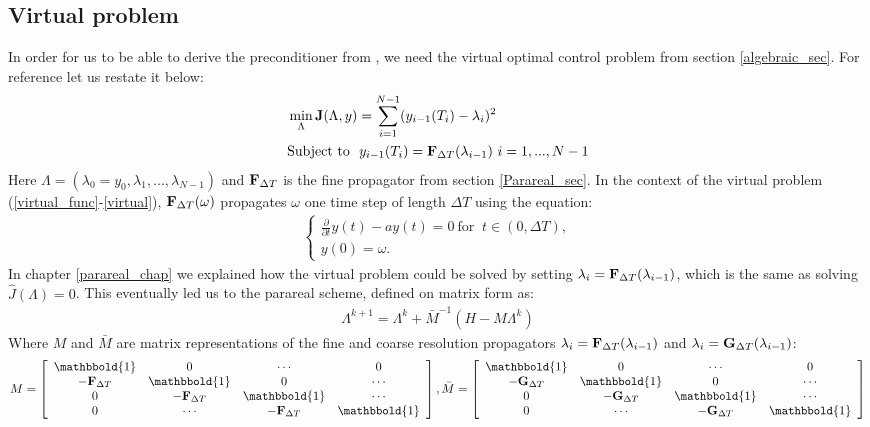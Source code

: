 \subsection{Virtual problem} \label{vir_sec}
In order for us to be able to derive the preconditioner from \cite{maday2002parareal}, we need the virtual optimal control problem from section \ref{algebraic_sec}. For reference let us restate it below:
\begin{align}
&\min_{\Lambda}\bold{J}(\Lambda,y) = \sum_{i=1}^{N-1} (y_{i-1}(T_{i})-\lambda_{i})^2 \label{virtual_func} \\
&\textrm{Subject to } \ y_{i-1}(T_{i}) = \bold F_{\Delta T}(\lambda_{i-1}) \ i=1,...,N-1 \label{virtual}
\end{align}
Here $\Lambda=(\lambda_0=y_0,\lambda_1,...,\lambda_ {N-1})$ and $\bold F_{\Delta T}$ is the fine propagator from section \ref{Parareal_sec}. In the context of the virtual problem (\ref{virtual_func}-\ref{virtual}), $\bold F_{\Delta T}(\omega)$ propagates $\omega$ one time step of length $\Delta T$ using the equation:
\begin{align}
\left\{
     \begin{array}{lr}
       	\frac{\partial}{\partial t} y(t)-ay(t)=0  \ \textrm{for } \ t\in(0,\Delta T),\\
       	y(0)=\omega.
     \end{array}
   \right. \label{virtual_exs}
\end{align} 
In chapter \ref{parareal_chap} we explained how the virtual problem could be solved by setting $\lambda_i= \bold F_{\Delta T}(\lambda_{i-1})$, which is the same as solving $\hat{J}(\Lambda)=0$. This eventually led us to the parareal scheme, defined on matrix form as:
\begin{align}
\Lambda^{k+1} = \Lambda^k + \bar{M}^{-1}(H-M\Lambda^k)\label{par_mat_sys}
\end{align}
Where $M$ and $\bar{M}$ are matrix representations of the fine and coarse resolution propagators $\lambda_i= \bold F_{\Delta T}(\lambda_{i-1})$ and  $\lambda_i= \bold G_{\Delta T}(\lambda_{i-1})$:
\begin{align*}
M = \left[ \begin{array}{cccc}
   \mathbbold{1} & 0 & \cdots & 0 \\  
   -\bold{F}_{\Delta T} & \mathbbold{1} & 0 & \cdots \\ 
   0 &-\bold{F}_{\Delta T} & \mathbbold{1}  & \cdots \\
   0 &\cdots &-\bold{F}_{\Delta T} & \mathbbold{1}  \\
   \end{array}  \right],
\bar{M} = \left[ \begin{array}{cccc}
   \mathbbold{1} & 0 & \cdots & 0 \\  
   -\bold{G}_{\Delta T} & \mathbbold{1} & 0 & \cdots \\ 
   0 &-\bold{G}_{\Delta T} & \mathbbold{1}  & \cdots \\
   0 &\cdots &-\bold{G}_{\Delta T} & \mathbbold{1}   \\
   \end{array}  \right]
\end{align*}
